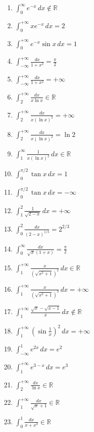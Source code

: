 \documentclass[11pt,a4paper]{article}
\begin{document}
\begin{enumerate}
\item $\displaystyle \int_{0}^{\infty} e^{-x} \, dx \notin \mathbb{R}$
\item $\displaystyle \int_{0}^{+\infty} x e^{-x} \, dx = 2$
\item $\displaystyle \int_{0}^{+\infty} e^{-x} \sin x \, dx = 1$
\item $\displaystyle \int_{-\infty}^{+\infty} \frac{dx}{1 + x^{2}} = \frac{\pi}{2}$
\item $\displaystyle \int_{-\infty}^{+\infty} \frac{dx}{1 + x^{2}} = +\infty$
\item $\displaystyle \int_{2}^{+\infty} \frac{dx}{x \ln x} \in \mathbb{R}$
\item $\displaystyle \int_{2}^{+\infty} \frac{dx}{x (\ln x)^{2}} = +\infty$
\item $\displaystyle \int_{2}^{+\infty} \frac{dx}{x (\ln x)^{2}} = \ln 2$
\item $\displaystyle \int_{1}^{\infty} \frac{1}{x(\ln x)^{2}} \, dx \in \mathbb{R}$
\item $\displaystyle \int_{0}^{\pi/2} \tan x \, dx = 1$
\item $\displaystyle \int_{0}^{\pi/2} \tan x \, dx = -\infty$
\item $\displaystyle \int_{1}^{2} \frac{1}{\sqrt{2 - x}} \, dx = +\infty$
\item $\displaystyle \int_{0}^{2} \frac{dx}{(2 - x)^{1/3}} = 2^{2/3}$
\item $\displaystyle \int_{0}^{\infty} \frac{dx}{\sqrt{x}(1 + x)} = \frac{\pi}{2}$
\item $\displaystyle \int_{1}^{+\infty} \frac{x}{\left(\sqrt{x^{2} + 1}\right)^{2}} \, dx \in \mathbb{R}$
\item $\displaystyle \int_{1}^{+\infty} \frac{x}{\left(\sqrt{x^{2} + 1}\right)^{3}} \, dx = +\infty$
\item $\displaystyle \int_{1}^{+\infty} \frac{\sqrt{x} - \sqrt{x - 1}}{x} \, dx \notin \mathbb{R}$
\item $\displaystyle \int_{1}^{+\infty} \left(\sin\frac{1}{x}\right)^{2} \, dx = +\infty$
\item $\displaystyle \int_{-\infty}^{1} e^{2x} \, dx = e^{2}$
\item $\displaystyle \int_{1}^{+\infty} e^{3 - x} \, dx = e^{3}$
\item $\displaystyle \int_{2}^{+\infty} \frac{dx}{\ln x} \in \mathbb{R}$
\item $\displaystyle \int_{1}^{+\infty} \frac{dx}{\sqrt{x} + 1} \in \mathbb{R}$
\item $\displaystyle \int_{0}^{1} \frac{dx}{x + x^{3}} \in \mathbb{R}$

\end{enumerate}
\end{document}
